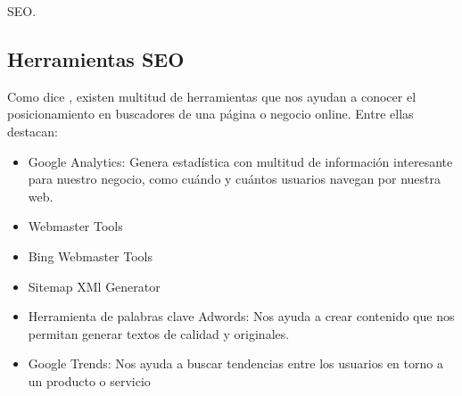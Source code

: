 \begin{section}{SEO.}
		\subsection{Herramientas SEO}
		
		Como dice \cite{seoc}, existen multitud de herramientas que nos ayudan a conocer el posicionamiento en buscadores de una página o negocio online. Entre ellas destacan:
		\begin{itemize}
			\item Google Analytics: Genera estadística con multitud de información interesante para nuestro negocio,  como cuándo y cuántos usuarios navegan por nuestra web.
			\item Webmaster Tools
			\item Bing Webmaster Tools
			\item Sitemap XMl Generator
			\item Herramienta de palabras clave Adwords: Nos ayuda a crear contenido que nos permitan generar textos de calidad y originales.
			\item Google Trends: Nos ayuda a buscar tendencias entre los usuarios en torno a un producto o servicio
		\end{itemize}
		
	\end{section}
	
	\newpage
	
